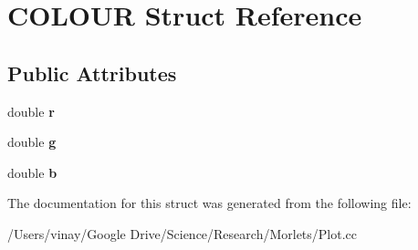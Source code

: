 \hypertarget{struct_c_o_l_o_u_r}{}\section{C\+O\+L\+O\+U\+R Struct Reference}
\label{struct_c_o_l_o_u_r}
\subsection*{Public Attributes}
\begin{DoxyCompactItemize}
\item 
\hypertarget{struct_c_o_l_o_u_r_a36bcdaa21c239b52ea145b00f6c02fef}{}double {\bfseries r}\label{struct_c_o_l_o_u_r_a36bcdaa21c239b52ea145b00f6c02fef}

\item 
\hypertarget{struct_c_o_l_o_u_r_a7f555cfaee6a22851493dabb733b39aa}{}double {\bfseries g}\label{struct_c_o_l_o_u_r_a7f555cfaee6a22851493dabb733b39aa}

\item 
\hypertarget{struct_c_o_l_o_u_r_aa6afa49758b045d49ca99641097956b3}{}double {\bfseries b}\label{struct_c_o_l_o_u_r_aa6afa49758b045d49ca99641097956b3}

\end{DoxyCompactItemize}


The documentation for this struct was generated from the following file\+:\begin{DoxyCompactItemize}
\item 
/\+Users/vinay/\+Google Drive/\+Science/\+Research/\+Morlets/Plot.\+cc\end{DoxyCompactItemize}
